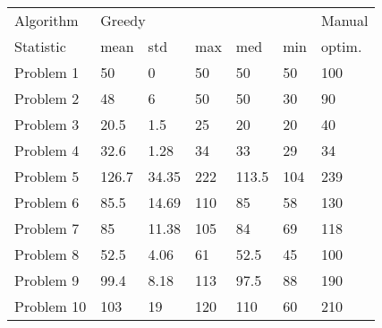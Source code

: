 \begin{tabular}{lllllll}
\toprule
Algorithm & \multicolumn{5}{l}{Greedy} & Manual \\
Statistic &   mean &    std &  max &    med &  min & optim. \\
\midrule
Problem 1  &     50 &      0 &   50 &     50 &   50 &    100 \\
Problem 2  &     48 &      6 &   50 &     50 &   30 &     90 \\
Problem 3  &   20.5 &    1.5 &   25 &     20 &   20 &     40 \\
Problem 4  &   32.6 &   1.28 &   34 &     33 &   29 &     34 \\
Problem 5  &  126.7 &  34.35 &  222 &  113.5 &  104 &    239 \\
Problem 6  &   85.5 &  14.69 &  110 &     85 &   58 &    130 \\
Problem 7  &     85 &  11.38 &  105 &     84 &   69 &    118 \\
Problem 8  &   52.5 &   4.06 &   61 &   52.5 &   45 &    100 \\
Problem 9  &   99.4 &   8.18 &  113 &   97.5 &   88 &    190 \\
Problem 10 &    103 &     19 &  120 &    110 &   60 &    210 \\
\bottomrule
\end{tabular}
